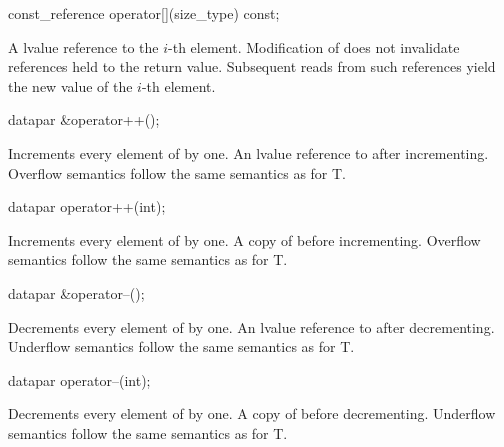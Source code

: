 \begin{itemdecl}
const_reference operator[](size_type) const;
\end{itemdecl}
\begin{itemdescr}
  \pnum\returns A \const lvalue reference to the $i$-th element.
  \pnum\postconditions Modification of  does not invalidate references held to the return value.
  Subsequent reads from such references yield the new value of the $i$-th element.
\end{itemdescr}

\begin{itemdecl}
datapar &operator++();
\end{itemdecl}
\begin{itemdescr}
  \pnum\effects Increments every element of  by one.
  \pnum\returns An lvalue reference to  after incrementing.
  \pnum\remarks Overflow semantics follow the same semantics as for \type T.
\end{itemdescr}

\begin{itemdecl}
datapar operator++(int);
\end{itemdecl}
\begin{itemdescr}
  \pnum\effects Increments every element of  by one.
  \pnum\returns A copy of  before incrementing.
  \pnum\remarks Overflow semantics follow the same semantics as for \type T.
\end{itemdescr}

\begin{itemdecl}
datapar &operator--();
\end{itemdecl}
\begin{itemdescr}
  \pnum\effects Decrements every element of  by one.
  \pnum\returns An lvalue reference to  after decrementing.
  \pnum\remarks Underflow semantics follow the same semantics as for \type T.
\end{itemdescr}

\begin{itemdecl}
datapar operator--(int);
\end{itemdecl}
\begin{itemdescr}
  \pnum\effects Decrements every element of  by one.
  \pnum\returns A copy of  before decrementing.
  \pnum\remarks Underflow semantics follow the same semantics as for \type T.
\end{itemdescr}

